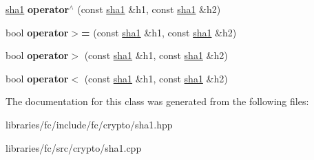 \begin{DoxyCompactItemize}
\mbox{\label{classfc_1_1sha1_a469c70d7922485f27bb811490ad334c6}} 
\mbox{\hyperlink{classfc_1_1sha1}{sha1}} {\bfseries operator$^\wedge$} (const \mbox{\hyperlink{classfc_1_1sha1}{sha1}} \&h1, const \mbox{\hyperlink{classfc_1_1sha1}{sha1}} \&h2)
\item 
\mbox{\label{classfc_1_1sha1_ab3447989e7212b65729eab352397eb55}} 
bool {\bfseries operator$>$=} (const \mbox{\hyperlink{classfc_1_1sha1}{sha1}} \&h1, const \mbox{\hyperlink{classfc_1_1sha1}{sha1}} \&h2)
\item 
\mbox{\label{classfc_1_1sha1_a678374e9b6c8bf5549fde635f45ca8da}} 
bool {\bfseries operator$>$} (const \mbox{\hyperlink{classfc_1_1sha1}{sha1}} \&h1, const \mbox{\hyperlink{classfc_1_1sha1}{sha1}} \&h2)
\item 
\mbox{\label{classfc_1_1sha1_a6c29b9daf163c2bc1541ffdbcce454f5}} 
bool {\bfseries operator$<$} (const \mbox{\hyperlink{classfc_1_1sha1}{sha1}} \&h1, const \mbox{\hyperlink{classfc_1_1sha1}{sha1}} \&h2)
\end{DoxyCompactItemize}


The documentation for this class was generated from the following files\+:\begin{DoxyCompactItemize}
\item 
libraries/fc/include/fc/crypto/sha1.\+hpp\item 
libraries/fc/src/crypto/sha1.\+cpp\end{DoxyCompactItemize}
